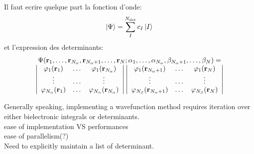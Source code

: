 \documentclass[./thesis.tex]{subfiles}
\begin{document}
\alert{ Il faut ecrire quelque part la fonction d'onde:
$$ \ket{\Psi} = \sum_I^{N_\text{det}} c_I {\ket*{I}} $$
et l'expression des determinants:
\begin{equation}
\begin{array}{c}
 \Psi({\bf r}_1,\dots,{\bf r}_{{N_\alpha}},{\bf r}_{{N_\alpha}+1},\dots,{\bf r}_N;
      \alpha_1,\dots,\alpha_{{N_\alpha}},\beta_{{N_\alpha}+1},\dots,\beta_N) = \\
\left|
 \begin{array}{ccc}
 \varphi_1({\bf r}_1) & \dots & \varphi_1({\bf r}_{{N_\alpha}}) \\
 \vdots               & \dots &   \vdots             \\
 \varphi_{{N_\alpha}}({\bf r}_1) & \dots & \varphi_{{N_\alpha}}({\bf r}_{{N_\alpha}}) \\
 \end{array}
\right|
\left|
 \begin{array}{ccc}
 \varphi_1({\bf r}_{{N_\alpha}+1}) & \dots & \varphi_1({\bf r}_{N}) \\
 \vdots               & \dots &   \vdots             \\
 \varphi_{N_\beta}({\bf r}_{{N_\alpha}+1}) & \dots & \varphi_{N_\beta}({\bf r}_{N}) \\
 \end{array}
\right|
\end{array} 
\label{eq:slater}
\end{equation}
}

Generally speaking, implementing a wavefunction method requires iteration over either bielectronic integrals or determinants. \\
ease of implementation VS performances \\
ease of parallelism(?) \\
Need to explicitly maintain a list of determinant. \\
\end{document}
